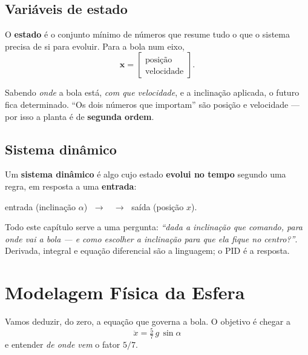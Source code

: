 \section{Vari\'aveis de estado}
O \textbf{estado} \'e o conjunto m\'inimo de n\'umeros que resume tudo o que o
sistema precisa de si para evoluir. Para a bola num eixo,
\[
\mathbf{x} = \begin{bmatrix} \text{posi\c{c}\~ao} \\[2pt] \text{velocidade}\end{bmatrix}.
\]
\begin{intuicao}
Sabendo \emph{onde} a bola est\'a, \emph{com que velocidade}, e a inclina\c{c}\~ao
aplicada, o futuro fica determinado. ``Os dois n\'umeros que importam'' s\~ao
posi\c{c}\~ao e velocidade --- por isso a planta \'e de \textbf{segunda ordem}.
\end{intuicao}

\section{Sistema din\^amico}
Um \textbf{sistema din\^amico} \'e algo cujo estado \textbf{evolui no tempo} segundo
uma regra, em resposta a uma \textbf{entrada}:
\begin{center}
entrada (inclina\c{c}\~ao $\alpha$) $\;\rightarrow\;$  $\;\rightarrow\;$ sa\'ida (posi\c{c}\~ao $x$).
\end{center}
\begin{projeto}
Todo este cap\'itulo serve a uma pergunta: \emph{``dada a inclina\c{c}\~ao que
comando, para onde vai a bola --- e como escolher a inclina\c{c}\~ao para que ela
fique no centro?''}. Derivada, integral e equa\c{c}\~ao diferencial s\~ao a
linguagem; o PID \'e a resposta.
\end{projeto}

\chapter{Modelagem F\'isica da Esfera}\label{cap:modelagem}

Vamos deduzir, do zero, a equa\c{c}\~ao que governa a bola. O objetivo \'e chegar a
\begin{equation}
\boxed{\ \ddot{x} = \tfrac{5}{7}\,g\,\sin\alpha\ }
\label{eq:planta-nl}
\end{equation}
e entender \emph{de onde vem} o fator $5/7$.

